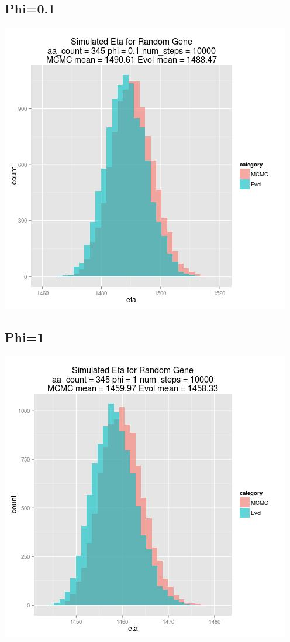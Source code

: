 \documentclass{article}
\begin{document}
\subsection{Phi=0.1}

\includegraphics[scale=.5]{01_phi.jpg}
\subsection{Phi=1}
\includegraphics[scale=0.5]{1_phi.jpg}
\end{document}
